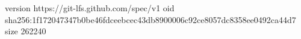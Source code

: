 version https://git-lfs.github.com/spec/v1
oid sha256:1f172047347b0be46fdceebcec43db8900006c92ce8057dc8358ee0492ca44d7
size 262240
